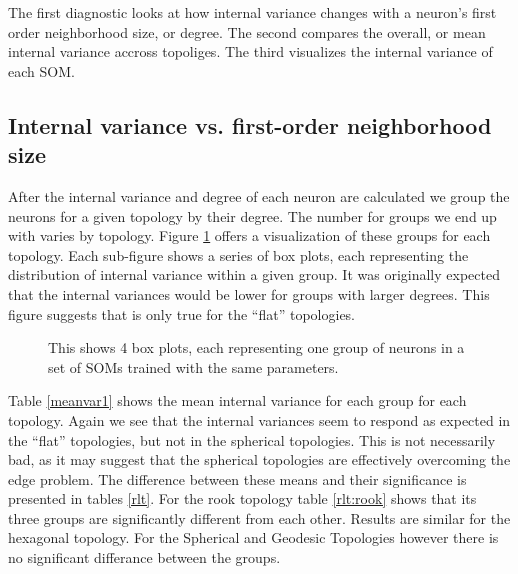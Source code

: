 The first diagnostic looks at how internal variance changes with a neuron's first
order neighborhood size, or degree.  The second compares the overall, or mean
internal variance accross topoliges.  The third visualizes the internal
variance of each SOM.

\subsection{Internal variance vs. first-order neighborhood size}
After the internal variance and degree of each neuron are calculated we
group the neurons for a given topology by their degree. The number for groups
we end up with varies by topology. Figure \ref{boxplot} offers a visualization
of these groups for each topology.  Each sub-figure shows a series of box
plots, each representing the distribution of internal variance within a given
group.  It was originally expected that the internal variances would be lower
for groups with larger degrees. This figure suggests that is only true for the
``flat'' topologies.

\begin{figure}[hbt]
\centering
{}
\caption{This shows 4 box plots, each representing one group of neurons in a set
of SOMs trained with the same parameters.}
\label{boxplot}
\end{figure}

Table \ref{meanvar1} shows the mean internal variance for each group for each
topology. Again we see that the internal variances seem to respond as expected
in the ``flat'' topologies, but not in the spherical topologies.  This is not
necessarily bad, as it may suggest that the spherical topologies are
effectively overcoming the edge problem.  The difference between these means
and their significance is presented in tables \ref{rlt}.  For the rook
topology table \ref{rlt:rook} shows that its three groups are significantly
different from each other. Results are similar for the hexagonal topology. For
the Spherical and Geodesic Topologies however there is no significant
differance between the groups.

